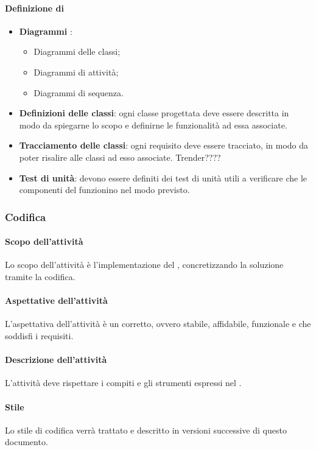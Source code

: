  \paragraph{Definizione di }
\begin{itemize}
	\item \textbf{Diagrammi }:
	\begin{itemize}
		\item Diagrammi delle classi;
		\item Diagrammi di attività;
		\item Diagrammi di sequenza.
	\end{itemize}
	\item \textbf{Definizioni delle classi}: ogni classe progettata deve essere descritta in modo da spiegarne lo scopo e definirne le
funzionalità ad essa associate.
	\item \textbf{Tracciamento delle classi}: ogni requisito deve essere tracciato, in modo da poter risalire alle classi ad esso associate. Trender????
	\item \textbf{Test di unità}: devono essere definiti dei test di unità utili a verificare che le componenti del 
funzionino nel modo previsto.
\end{itemize}

\subsubsection{Codifica}
 \paragraph{Scopo dell'attività}
 Lo scopo dell'attività è l'implementazione del , concretizzando la soluzione tramite la codifica.  
 \paragraph{Aspettative dell'attività}
 L'aspettativa dell'attività è un  corretto, ovvero stabile, affidabile, funzionale e che soddisfi i requisiti. 
 \paragraph{Descrizione dell'attività}
 L'attività deve rispettare i compiti e gli strumenti espressi nel \PPdocRR.
 \paragraph{Stile}
 Lo stile di codifica verrà trattato e descritto in versioni successive di questo documento.
